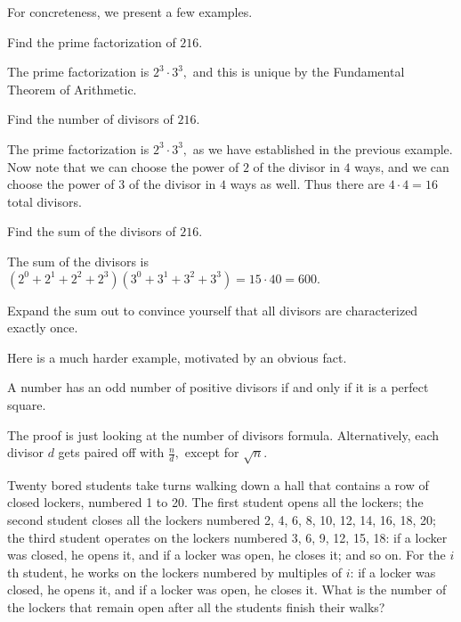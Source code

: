 \documentclass{article}
\begin{document}
For concreteness, we present a few examples.
\begin{exam}
Find the prime factorization of $216.$
\end{exam}
\begin{sol}
The prime factorization is $2^3\cdot 3^3,$ and this is unique by the Fundamental Theorem of Arithmetic.
\end{sol}
\begin{exam}
Find the number of divisors of $216.$
\end{exam}
\begin{sol}
The prime factorization is $2^3\cdot 3^3,$ as we have established in the previous example. Now note that we can choose the power of $2$ of the divisor in $4$ ways, and we can choose the power of $3$ of the divisor in $4$ ways as well. Thus there are $4\cdot 4=16$ total divisors.
\end{sol}
\begin{exam}
Find the sum of the divisors of $216.$
\end{exam}
\begin{sol}
The sum of the divisors is $(2^0+2^1+2^2+2^3)(3^0+3^1+3^2+3^3)=15\cdot 40=600.$

Expand the sum out to convince yourself that all divisors are characterized exactly once.
\end{sol}
Here is a much harder example, motivated by an obvious fact.
\begin{fact}
A number has an odd number of positive divisors if and only if it is a perfect square.
\end{fact}
The proof is just looking at the number of divisors formula. Alternatively, each divisor $d$ gets paired off with $\frac{n}{d},$ except for $\sqrt{n}.$

\begin{exam}[104 NT]
Twenty bored students take turns walking down a hall that contains a row of closed lockers, numbered 1 to 20. The first student opens all the lockers; the second student closes all the lockers numbered 2, 4, 6, 8, 10, 12, 14, 16, 18, 20; the third student operates on the lockers numbered 3, 6, 9, 12, 15, 18: if a locker was closed, he opens it, and if a locker was open, he closes it; and so on. For the $i$th student, he works on the lockers numbered by multiples of $i$: if a locker was closed, he opens it, and if a locker was open, he closes it. What is the number of the lockers that remain open after all the students finish their walks?
\end{exam}
\end{document}
